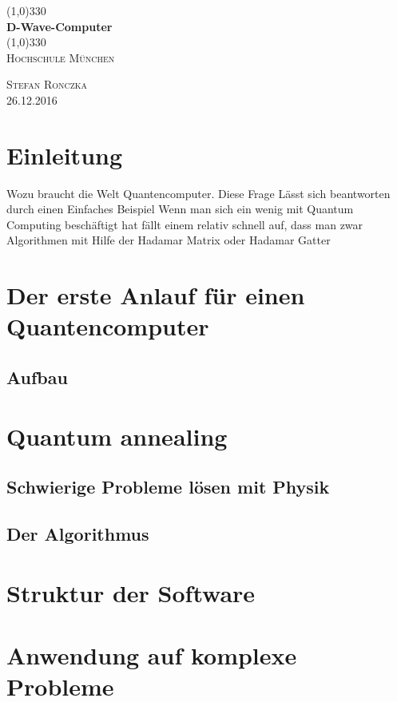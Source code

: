 \documentclass{article}
\begin{document}
\begin{titlepage}
	\begin{center}
	\line(1,0){330} \\
	\vspace{.75 cm}
	\huge{\bfseries D-Wave-Computer}\\
	\vspace{.25 cm}
	\line(1,0){330} \\
	\vspace{1.5 cm}
	\textsc{\LARGE Hochschule M\"unchen}\\
	\vspace{10 cm}
	\end{center}
	\begin{flushright}
	\textsc{\large Stefan Ronczka\\26.12.2016}
	\end{flushright}
\end{titlepage}

\tableofcontents
\thispagestyle{empty}
\cleardoublepage

\setcounter{page}{1}
\section{Einleitung}\label{sec:intro}

Wozu braucht die Welt Quantencomputer. Diese Frage Lässt sich beantworten durch einen Einfaches Beispiel 
Wenn man sich ein wenig mit Quantum Computing beschäftigt hat fällt einem relativ schnell auf, dass man zwar Algorithmen mit Hilfe der Hadamar Matrix oder Hadamar Gatter
\section{Der erste Anlauf für einen Quantencomputer}\label{sec:historyDWave}
\subsection{Aufbau}\label{sec:funktion}\cite{ref:one}
\section{Quantum annealing}\label{sec:baseAlgo}
\subsection{Schwierige Probleme lösen mit Physik}\label{sec:historyAlgo}
\subsection{Der Algorithmus}\label{sec:algo}
\section{Struktur der Software}\label{sec:software}
\section{Anwendung auf komplexe Probleme}\label{sec:problems}

\cleardoublepage


\end{document}
